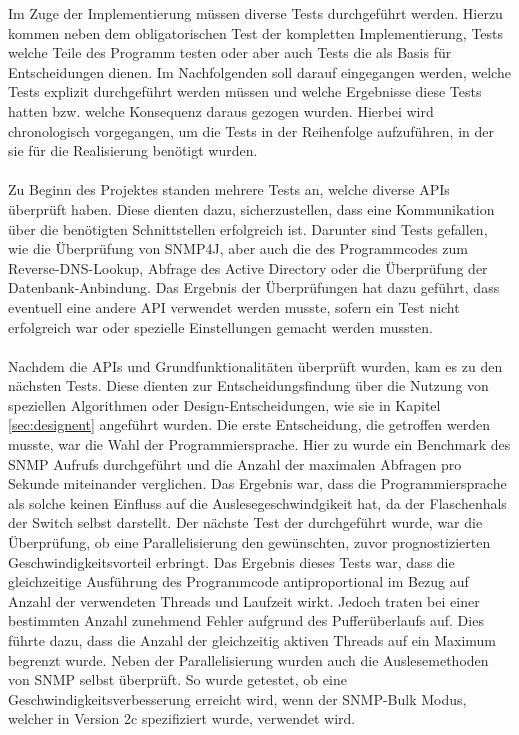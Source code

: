 Im Zuge der Implementierung müssen diverse Tests durchgeführt werden. Hierzu kommen neben dem obligatorischen Test der kompletten Implementierung, Tests welche Teile des Programm testen oder aber auch Tests die als Basis für Entscheidungen dienen.
Im Nachfolgenden soll darauf eingegangen werden, welche Tests explizit durchgeführt werden müssen und welche Ergebnisse diese Tests hatten bzw. welche Konsequenz daraus gezogen wurden. Hierbei wird chronologisch vorgegangen, um die Tests in der Reihenfolge aufzuführen, in der sie für die Realisierung benötigt wurden.\\\\
Zu Beginn des Projektes standen mehrere Tests an, welche diverse APIs überprüft haben. Diese dienten dazu, sicherzustellen, dass eine Kommunikation über die benötigten Schnittstellen erfolgreich ist. Darunter sind Tests gefallen, wie die Überprüfung von SNMP4J, aber auch die des Programmcodes zum Reverse-DNS-Lookup, Abfrage des Active Directory oder die  Überprüfung der Datenbank-Anbindung. Das Ergebnis der Überprüfungen hat dazu geführt, dass eventuell eine andere API verwendet werden musste, sofern ein Test nicht erfolgreich war oder spezielle Einstellungen gemacht werden mussten.\\\\
Nachdem die APIs und Grundfunktionalitäten überprüft wurden, kam es zu den nächsten Tests. Diese dienten zur Entscheidungsfindung über die Nutzung von speziellen Algorithmen oder Design-Entscheidungen, wie sie in Kapitel \ref{sec:designent} angeführt wurden.
Die erste Entscheidung, die getroffen werden musste, war die Wahl der Programmiersprache. Hier zu wurde ein Benchmark des SNMP Aufrufs durchgeführt und die Anzahl der maximalen  Abfragen pro Sekunde miteinander verglichen. Das Ergebnis war, dass die Programmiersprache als solche keinen Einfluss auf die Auslesegeschwindgikeit hat, da der Flaschenhals der Switch selbst darstellt. Der nächste Test der durchgeführt wurde, war die Überprüfung, ob eine Parallelisierung den gewünschten, zuvor prognostizierten Geschwindigkeitsvorteil erbringt. Das Ergebnis dieses Tests war, dass die gleichzeitige Ausführung des Programmcode antiproportional im Bezug auf Anzahl der verwendeten Threads und Laufzeit wirkt. Jedoch traten bei einer bestimmten Anzahl zunehmend Fehler aufgrund des Pufferüberlaufs auf. Dies führte dazu, dass die Anzahl der gleichzeitig aktiven Threads auf ein Maximum begrenzt wurde. Neben der Parallelisierung wurden auch die Auslesemethoden von SNMP selbst überprüft. So wurde getestet, ob eine Geschwindigkeitsverbesserung erreicht wird, wenn der SNMP-Bulk Modus, welcher in Version 2c spezifiziert wurde, verwendet wird.
